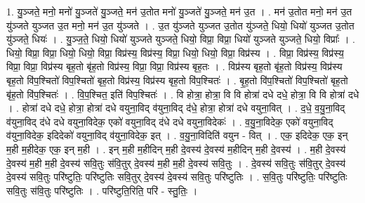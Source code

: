 \documentclass[17pt]{extarticle}
\begin{document}
1. यु॒ञ्जते॒ मनो॒ मनो॑ यु॒ञ्जते॑ यु॒ञ्जते॒ मन॑ उ॒तोत मनो॑ यु॒ञ्जते॑ यु॒ञ्जते॒ मन॑ उ॒त । . मन॑ उ॒तोत मनो॒ मन॑ उ॒त यु॑ञ्जते युञ्जत उ॒त मनो॒ मन॑ उ॒त यु॑ञ्जते । . उ॒त यु॑ञ्जते युञ्जत उ॒तोत यु॑ञ्जते॒ धियो॒ धियो॑ युञ्जत उ॒तोत यु॑ञ्जते॒ धियः॑ । . यु॒ञ्ज॒ते॒ धियो॒ धियो॑ युञ्जते युञ्जते॒ धियो॒ विप्रा॒ विप्रा॒ धियो॑ युञ्जते युञ्जते॒ धियो॒ विप्राः᳚ । . धियो॒ विप्रा॒ विप्रा॒ धियो॒ धियो॒ विप्रा॒ विप्र॑स्य॒ विप्र॑स्य॒ विप्रा॒ धियो॒ धियो॒ विप्रा॒ विप्र॑स्य । . विप्रा॒ विप्र॑स्य॒ विप्र॑स्य॒ विप्रा॒ विप्रा॒ विप्र॑स्य बृह॒तो बृ॑ह॒तो विप्र॑स्य॒ विप्रा॒ विप्रा॒ विप्र॑स्य बृह॒तः । . विप्र॑स्य बृह॒तो बृ॑ह॒तो विप्र॑स्य॒ विप्र॑स्य बृह॒तो वि॑प॒श्चितो॑ विप॒श्चितो॑ बृह॒तो विप्र॑स्य॒ विप्र॑स्य बृह॒तो वि॑प॒श्चितः॑ । . बृ॒ह॒तो वि॑प॒श्चितो॑ विप॒श्चितो॑ बृह॒तो बृ॑ह॒तो वि॑प॒श्चितः॑ । . वि॒प॒श्चित॒ इति॑ विप॒श्चितः॑ । . वि होत्रा॒ होत्रा॒ वि वि होत्रा॑ दधे दधे॒ होत्रा॒ वि वि होत्रा॑ दधे । . होत्रा॑ दधे दधे॒ होत्रा॒ होत्रा॑ दधे वयुना॒विद् व॑युना॒विद् द॑धे॒ होत्रा॒ होत्रा॑ दधे वयुना॒वित् । . द॒धे॒ व॒यु॒ना॒विद् व॑युना॒विद् द॑धे दधे वयुना॒विदेक॒ एको॑ वयुना॒विद् द॑धे दधे वयुना॒विदेकः॑ । . व॒यु॒ना॒विदेक॒ एको॑ वयुना॒विद् व॑युना॒विदेक॒ इदिदेको॑ वयुना॒विद् व॑युना॒विदेक॒ इत् । . व॒यु॒ना॒विदिति॑ वयुन - वित् । . एक॒ इदिदेक॒ एक॒ इन् म॒ही म॒हीदेक॒ एक॒ इन् म॒ही । . इन् म॒ही म॒हीदिन् म॒ही दे॒वस्य॑ दे॒वस्य॑ म॒हीदिन् म॒ही दे॒वस्य॑ । . म॒ही दे॒वस्य॑ दे॒वस्य॑ म॒ही म॒ही दे॒वस्य॑ सवि॒तुः स॑वि॒तुर् दे॒वस्य॑ म॒ही म॒ही दे॒वस्य॑ सवि॒तुः । . दे॒वस्य॑ सवि॒तुः स॑वि॒तुर् दे॒वस्य॑ दे॒वस्य॑ सवि॒तुः परि॑ष्टुतिः॒ परि॑ष्टुतिः सवि॒तुर् दे॒वस्य॑ दे॒वस्य॑ सवि॒तुः परि॑ष्टुतिः । . स॒वि॒तुः परि॑ष्टुतिः॒ परि॑ष्टुतिः सवि॒तुः स॑वि॒तुः परि॑ष्टुतिः । . परि॑ष्टुति॒रिति॒ परि॑ - स्तु॒तिः॒ । \newline
\end{document}
